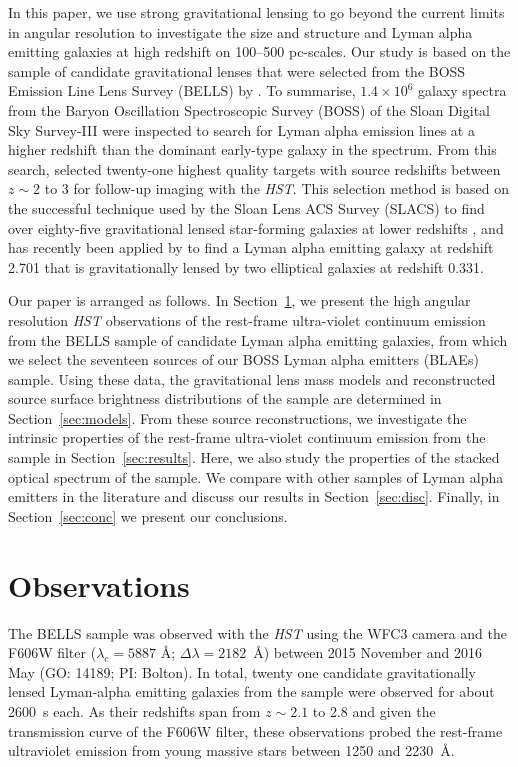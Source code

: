\documentclass[a4paper,fleqn,usenatbib]{mnras}
\begin{document}
In this paper, we use strong gravitational lensing to go beyond the current limits in angular resolution to investigate the size and structure and Lyman alpha emitting galaxies at high redshift on 100--500 pc-scales. Our study is based on the sample of candidate gravitational lenses that were selected from the BOSS Emission Line Lens Survey (BELLS) by \citet{Shu16}. To summarise, $1.4\times10^6$ galaxy spectra from the Baryon Oscillation Spectroscopic Survey (BOSS) of the Sloan Digital Sky Survey-III were inspected to search for Lyman alpha emission lines at a higher redshift than the dominant early-type galaxy in the spectrum. From this search, \citet{Shu16} selected twenty-one highest quality targets with source redshifts between $z\sim 2$ to 3 for follow-up imaging with the {\it HST}. This selection method is based on the successful technique used by the Sloan Lens ACS Survey (SLACS) to find over eighty-five gravitational lensed star-forming galaxies at lower redshifts \citep{auger09,bolton08}, and has recently been applied by \citet{Shu16a} to find a Lyman alpha emitting galaxy at redshift 2.701 that is gravitationally lensed by two elliptical galaxies at redshift 0.331.

Our paper is arranged as follows. In Section~\ref{sec:obs}, we present the high angular resolution {\it HST} observations of the rest-frame ultra-violet continuum emission from the BELLS sample of candidate Lyman alpha emitting galaxies, from which we select the seventeen sources of our BOSS Lyman alpha emitters (BLAEs) sample. Using these data, the gravitational lens mass models and reconstructed source surface brightness distributions of the sample are determined in Section~\ref{sec:models}. From these source reconstructions, we investigate the intrinsic properties of the rest-frame ultra-violet continuum emission from the sample in Section~\ref{sec:results}. Here, we also study the properties of the stacked optical spectrum of the sample. We compare with other samples of Lyman alpha emitters in the literature and discuss our results in Section~\ref{sec:disc}. Finally, in Section~\ref{sec:conc} we present our conclusions.

\section{Observations}
\label{sec:obs}

The BELLS sample was observed with the {\it HST} using the WFC3 camera and the F606W filter ($\lambda_c = 5887$ \AA; $\Delta\lambda = 2182$~\AA) between 2015 November and 2016 May (GO: 14189; PI: Bolton). In total, twenty one candidate gravitationally lensed Lyman-alpha emitting galaxies from the \citet{Shu16} sample were observed for about 2600~s each. As their redshifts span from $z \sim 2.1$ to 2.8 and given the transmission curve of the F606W filter, these observations probed the rest-frame ultraviolet emission from young massive stars between 1250 and 2230~\AA.
\end{document}

